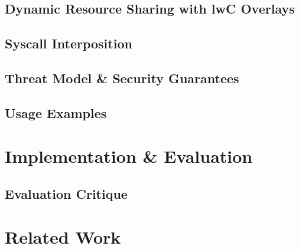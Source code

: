 \documentclass[10pt,twocolumn,letter]{article}
\begin{document}
\subsection{Dynamic Resource Sharing with lwC Overlays}\label{design:overlays}

\subsection{Syscall Interposition}\label{design:syscallinterpos}

\subsection{Threat Model \& Security Guarantees}\label{design:threat}

\subsection{Usage Examples}\label{design:usage}

\section{Implementation \& Evaluation}\label{eval}

\subsection{Evaluation Critique}\label{eval:crit}

\section{Related Work}\label{rel}
\end{document}
